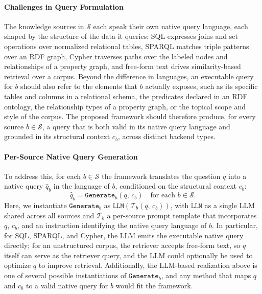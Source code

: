 \documentclass{llmxive}
\begin{document}
\paragraph{Challenges in Query Formulation}
The knowledge sources in $\mathcal{S}$ each speak their own native query language, each shaped by the structure of the data it queries: SQL expresses joins and set operations over normalized relational tables, SPARQL matches triple patterns over an RDF graph, Cypher traverses paths over the labeled nodes and relationships of a property graph, and free-form text drives similarity-based retrieval over a corpus. Beyond the difference in languages, an executable query for $b$ should also refer to the elements that $b$ actually exposes, such as its specific tables and columns in a relational schema, the predicates declared in an RDF ontology, the relationship types of a property graph, or the topical scope and style of the corpus. The proposed framework should therefore produce, for every source $b \in \mathcal{S}$, a query that is both valid in its native query language and grounded in its structural context $c_b$, across distinct backend types.

\paragraph{Per-Source Native Query Generation}
To address this, for each $b \in \mathcal{S}$ the framework translates the question $q$ into a native query $\hat{q}_b$ in the language of $b$, conditioned on the structural context $c_b$:
\begin{equation}
\hat{q}_b = \texttt{Generate}_b(q,\, c_b) \quad \text{for each } b \in \mathcal{S}.
\end{equation}
Here, we instantiate $\texttt{Generate}_b$ as $\texttt{LLM}(\mathcal{T}_b(q,\, c_b))$, with $\texttt{LLM}$ as a single LLM shared across all sources and $\mathcal{T}_b$ a per-source prompt template that incorporates $q$, $c_b$, and an instruction identifying the native query language of $b$. In particular, for SQL, SPARQL, and Cypher, the LLM emits the executable native query directly; for an unstructured corpus, the retriever accepts free-form text, so $q$ itself can serve as the retriever query, and the LLM could optionally be used to optimize $q$ to improve retrieval. Additionally, the LLM-based realization above is one of several possible instantiations of $\texttt{Generate}_b$, and any method that maps $q$ and $c_b$ to a valid native query for $b$ would fit the framework.
\end{document}
